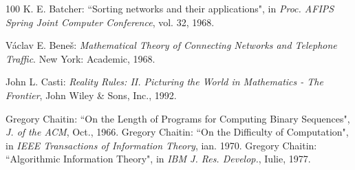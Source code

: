 \begin{thebibliography}{100}
 K. E. Batcher: ``Sorting networks and their applications", in {\em Proc. AFIPS Spring Joint Computer Conference}, vol. 32, 1968.

 V\' aclav E. Bene\v s: {\em Mathematical Theory of Connecting Networks and Telephone Traffic}. New York: Academic, 1968.






 John L. Casti: {\em Reality Rules: II. Picturing the World in Mathematics - The Frontier}, John Wiley \& Sons, Inc., 1992.


 Gregory Chaitin: ``On the Length of Programs for Computing Binary Sequences", {\em J. of the ACM}, Oct., 1966.
 Gregory Chaitin: ``On the Difficulty of Computation", in {\em IEEE Transactions of Information Theory}, ian. 1970.
 Gregory Chaitin: ``Algorithmic Information Theory",  in {\em IBM J. Res. Develop.}, Iulie, 1977.



\end{thebibliography}
